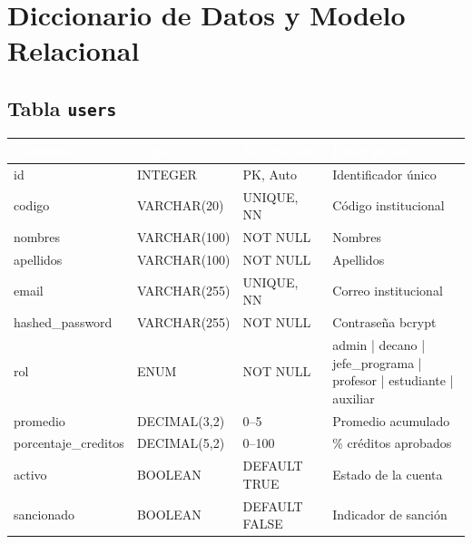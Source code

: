 \documentclass[12pt,a4paper,twoside]{report}
\begin{document}
\chapter{Diccionario de Datos y Modelo Relacional}

\section{Tabla \texttt{users}}
\begin{center}
\begin{tabularx}{\textwidth}{|l|l|l|X|}
\hline
\rowcolor{tableHdr}
\textcolor{white}{\textbf{Columna}} & \textcolor{white}{\textbf{Tipo}} &
\textcolor{white}{\textbf{Restricción}} & \textcolor{white}{\textbf{Descripción}} \\
\hline
\rowcolor{rowOdd}id & INTEGER & PK, Auto & Identificador único \\
\hline\rowcolor{rowEven}codigo & VARCHAR(20) & UNIQUE, NN & Código institucional \\
\hline\rowcolor{rowOdd}nombres & VARCHAR(100) & NOT NULL & Nombres \\
\hline\rowcolor{rowEven}apellidos & VARCHAR(100) & NOT NULL & Apellidos \\
\hline\rowcolor{rowOdd}email & VARCHAR(255) & UNIQUE, NN & Correo institucional \\
\hline\rowcolor{rowEven}hashed\_password & VARCHAR(255) & NOT NULL & Contraseña bcrypt \\
\hline\rowcolor{rowOdd}rol & ENUM & NOT NULL & admin | decano | jefe\_programa | profesor | estudiante | auxiliar \\
\hline\rowcolor{rowEven}promedio & DECIMAL(3,2) & 0--5 & Promedio acumulado \\
\hline\rowcolor{rowOdd}porcentaje\_creditos & DECIMAL(5,2) & 0--100 & \% créditos aprobados \\
\hline\rowcolor{rowEven}activo & BOOLEAN & DEFAULT TRUE & Estado de la cuenta \\
\hline\rowcolor{rowOdd}sancionado & BOOLEAN & DEFAULT FALSE & Indicador de sanción \\
\hline
\end{tabularx}
\end{center}
\end{document}
